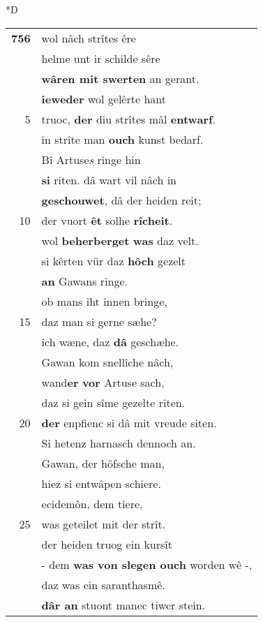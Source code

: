 \documentclass[8pt,a4paper,notitlepage]{article}
\begin{document}
\begin{table}[ht]
\begin{minipage}[t]{0.5\linewidth}
\small
\begin{center}*D
\end{center}
\begin{tabular}{rl}
\textbf{756} & wol nâch strîtes êre\\ 
 & helme unt ir schilde sêre\\ 
 & \textbf{wâren mit swerten} an gerant.\\ 
 & \textbf{ieweder} wol gelêrte hant\\ 
5 & truoc, \textbf{der} diu strîtes mâl \textbf{entwarf}.\\ 
 & in strîte man \textbf{ouch} kunst bedarf.\\ 
 & Bî Artuse\textit{s} ringe hin\\ 
 & \textbf{si} riten. dâ wart vil nâch in\\ 
 & \textbf{geschouwet}, dâ der heiden reit;\\ 
10 & der vuort \textbf{êt} solhe \textbf{rîcheit}.\\ 
 & wol \textbf{beherberget} \textbf{was} daz velt.\\ 
 & si kêrten vür daz \textbf{hôch} gezelt\\ 
 & \textbf{an} Gawans ringe.\\ 
 & ob mans iht innen bringe,\\ 
15 & daz man si gerne sæhe?\\ 
 & ich wæne, daz \textbf{dâ} geschæhe.\\ 
 & Gawan kom snellîche nâch,\\ 
 & wand\textbf{er} \textbf{vor} Artuse sach,\\ 
 & daz si gein sîme gezelte riten.\\ 
20 & \textbf{der} enpfienc si dâ mit vreude siten.\\ 
 & Si hetenz harnasch dennoch an.\\ 
 & Gawan, der höfsche man,\\ 
 & hiez si entwâpen schiere.\\ 
 & ecidemôn, dem tiere,\\ 
25 & was geteilet mit der strît.\\ 
 & der heiden truog ein kursît\\ 
 & - dem \textbf{was von slegen ouch} worden wê -,\\ 
 & daz was ein saranthasmê.\\ 
 & \textbf{dâr an} stuont manec tiwer stein.\\ 

\end{tabular}
\end{minipage}
\end{table}
\end{document}
